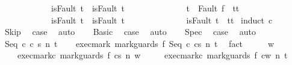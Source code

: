 \begin{isabellebody}
\ \ \ \ \ \ \ \ \ \ \ \ {\isacharparenleft}isFault\ t\ {\isasymlongrightarrow}\ isFault\ t{\isacharprime}{\isacharparenright}\ {\isasymand}\ \isanewline
\ \ \ \ \ \ \ \ \ \ \ \ {\isacharparenleft}t{\isacharprime}\ {\isacharequal}\ Fault\ f\ {\isasymlongrightarrow}\ t{\isacharprime}{\isacharequal}t{\isacharparenright}\ {\isasymand}\isanewline
\ \ \ \ \ \ \ \ \ \ \ \ {\isacharparenleft}isFault\ t{\isacharprime}\ {\isasymlongrightarrow}\ isFault\ t{\isacharparenright}\ {\isasymand}\isanewline
\ \ \ \ \ \ \ \ \ \ \ \ {\isacharparenleft}{\isasymnot}\ isFault\ t{\isacharprime}\ {\isasymlongrightarrow}\ t{\isacharprime}{\isacharequal}t{\isacharparenright}{\isachardoublequoteclose}\isanewline
%
\isadelimproof
%
\endisadelimproof
%
\isatagproof
{}\isamarkupfalse%
\ {\isacharparenleft}induct\ c{\isacharparenright}\isanewline
\ \ \isamarkupfalse%
\ Skip\ \isamarkupfalse%
\ {\isacharquery}case\ \isamarkupfalse%
\ auto\isanewline
{}\isamarkupfalse%
\isanewline
\ \ \isamarkupfalse%
\ Basic\ \isamarkupfalse%
\ {\isacharquery}case\ \isamarkupfalse%
\ auto\isanewline
{}\isamarkupfalse%
\isanewline
\ \ \isamarkupfalse%
\ Spec\ \isamarkupfalse%
\ {\isacharquery}case\ \isamarkupfalse%
\ auto\isanewline
{}\isamarkupfalse%
\isanewline
\ \ \isamarkupfalse%
\ {\isacharparenleft}Seq\ c{}\ c{}\ s\ n\ t{\isacharparenright}\isanewline
\ \ \isamarkupfalse%
\ exec{\isacharunderscore}mark{\isacharcolon}\ {\isachardoublequoteopen}{\isasymGamma}{\isasymturnstile}{\isasymlangle}mark{\isacharunderscore}guards\ f\ {\isacharparenleft}Seq\ c{}\ c{}{\isacharparenright}{\isacharcomma}s{\isasymrangle}\ {\isacharequal}n{\isasymRightarrow}\ t{\isachardoublequoteclose}\ \isamarkupfalse%
\ fact\isanewline
\ \ \isamarkupfalse%
\ \isamarkupfalse%
\ w\ \ \isanewline
\ \ \ \ exec{\isacharunderscore}mark{\isacharunderscore}c{}{\isacharcolon}\ {\isachardoublequoteopen}{\isasymGamma}{\isasymturnstile}{\isasymlangle}mark{\isacharunderscore}guards\ f\ c{}{\isacharcomma}s{\isasymrangle}\ {\isacharequal}n{\isasymRightarrow}\ w{\isachardoublequoteclose}\ \isanewline
\ \ \ \ exec{\isacharunderscore}mark{\isacharunderscore}c{}{\isacharcolon}\ {\isachardoublequoteopen}{\isasymGamma}{\isasymturnstile}{\isasymlangle}mark{\isacharunderscore}guards\ f\ c{}{\isacharcomma}w{\isasymrangle}\ {\isacharequal}n{\isasymRightarrow}\ t{\isachardoublequoteclose}\isanewline

\end{isabellebody}
